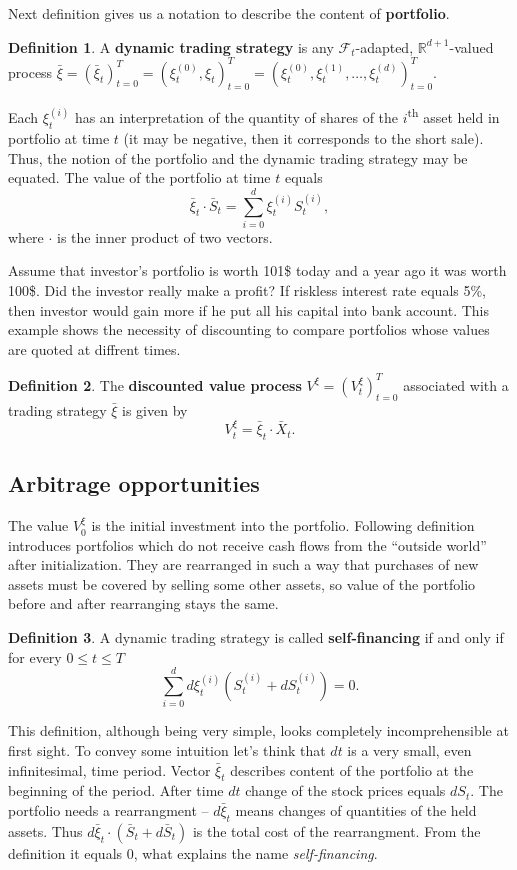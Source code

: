 \documentclass[a4paper,12pt, oneside]{book}
\theoremstyle{definition}
\newtheorem{mydef}{Definition}[chapter]
\theoremstyle{remark}
\def\R{{\mathbb{R}}}
\def\Sa{\bar{S}}
\def\Xa{\bar{X}}
\def\xia{\bar{\xi}}
\begin{document}
Next definition gives us a notation to describe the content of \textbf{portfolio}.
\begin{mydef}
A \textbf{dynamic trading strategy} is any $\mathcal{F}_t$-adapted,  $\R^{d+1}$-valued process $\xia = (\xia_t)_{t=0}^T = (\xi^{(0)}_t, \xi_t)_{t=0}^T = (\xi^{(0)}_t, \xi^{(1)}_t, \ldots, \xi^{(d)}_t)_{t=0}^T$.
\end{mydef}
Each $\xi^{(i)}_t$ has an interpretation of the quantity of shares of the $i$\textsuperscript{th} asset held in portfolio at time $t$ (it may be negative, then it corresponds to the short sale). Thus, the notion of the portfolio and the dynamic trading strategy may be equated. The value of the portfolio at time $t$ equals
\[\xia_t \cdot \Sa_t = \sum\limits_{i=0}^d \xi^{(i)}_t S^{(i)}_t,\]
where $\cdot$ is the inner product of two vectors.

Assume that investor's portfolio is worth 101\$ today and a year ago it was worth 100\$. Did the investor really make a profit? If riskless interest rate equals 5\%, then investor would gain more if he put all his capital into bank account. This example shows the necessity of discounting to compare portfolios whose values are quoted at diffrent times.
\begin{mydef}
 The \textbf{discounted value process} $V^{\xi} = (V^{\xi}_t)_{t=0}^T$ associated with a trading strategy $\xia$ is given by 
 \begin{equation*}
  V^{\xi}_t = \xia_t \cdot \Xa_t.
 \end{equation*}
\end{mydef}

\subsection{Arbitrage opportunities}
The value $V^{\xi}_0$ is the initial investment into the portfolio. Following definition introduces portfolios which do not receive cash flows from the ``outside world'' after initialization. They are rearranged in such a way that purchases of new assets must be covered by selling some other assets, so value of the portfolio before and after rearranging stays the same.
\begin{mydef}
 A dynamic trading strategy is called \textbf{self-financing} if and only if for every $0 \leq t \leq T$
 \[ \sum\limits_{i=0}^d d\xi^{(i)}_t (S^{(i)}_t + dS^{(i)}_t) = 0. \]
\end{mydef}
This definition, although being very simple, looks completely incomprehensible at first sight. To convey some intuition let's think that $dt$ is a very small, even infinitesimal, time period. Vector $\xia_t$ describes content of the portfolio at the beginning of the period. After time $dt$ change of the stock prices equals $dS_t$. The portfolio needs a rearrangment -- $d\xia_t$ means changes of quantities of the held assets.
Thus $d\xia_t \cdot (\Sa_t + d\Sa_t)$ is the total cost of the rearrangment. From the definition it equals 0, what explains the name \textit{self-financing}.
\end{document}
